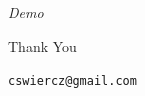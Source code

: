 \documentclass{beamer}
\begin{document}
\begin{frame}{}{}
  \begin{center}
    {\Huge \it Demo}
  \end{center}
\end{frame}


\begin{frame}{}{}
  \begin{center}
    {\Huge Thank You}

    \vspace{12pt}
    
    {\tt cswiercz@gmail.com}
  \end{center}
\end{frame}


\end{document}
